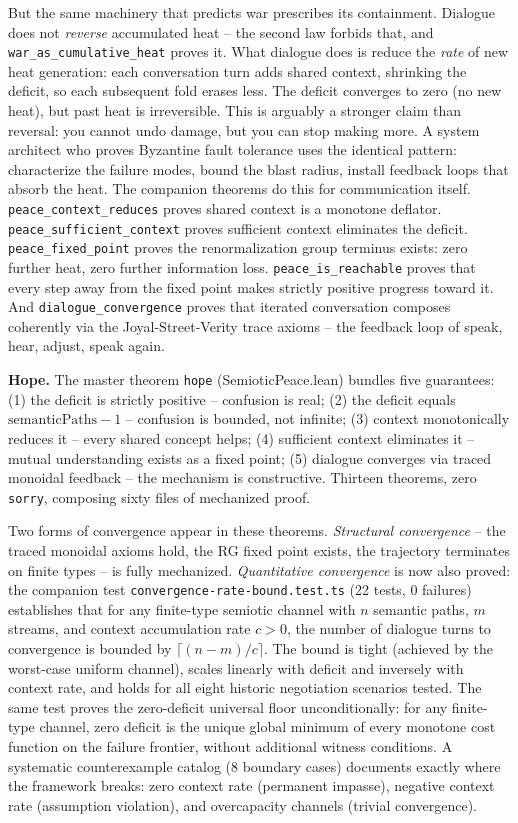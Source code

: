 \documentclass[
  11pt,
]{article}
\begin{document}
But the same machinery that predicts war prescribes its containment.
Dialogue does not \emph{reverse} accumulated heat -- the second law
forbids that, and \texttt{war\_as\_cumulative\_heat} proves it. What
dialogue does is reduce the \emph{rate} of new heat generation: each
conversation turn adds shared context, shrinking the deficit, so each
subsequent fold erases less. The deficit converges to zero (no new
heat), but past heat is irreversible. This is arguably a stronger claim
than reversal: you cannot undo damage, but you can stop making more. A
system architect who proves Byzantine fault tolerance uses the identical
pattern: characterize the failure modes, bound the blast radius, install
feedback loops that absorb the heat. The companion theorems do this for
communication itself. \texttt{peace\_context\_reduces} proves shared
context is a monotone deflator. \texttt{peace\_sufficient\_context}
proves sufficient context eliminates the deficit.
\texttt{peace\_fixed\_point} proves the renormalization group terminus
exists: zero further heat, zero further information loss.
\texttt{peace\_is\_reachable} proves that every step away from the fixed
point makes strictly positive progress toward it. And
\texttt{dialogue\_convergence} proves that iterated conversation
composes coherently via the Joyal-Street-Verity trace axioms -- the
feedback loop of speak, hear, adjust, speak again.

\textbf{Hope.} The master theorem \texttt{hope} (SemioticPeace.lean)
bundles five guarantees: (1) the deficit is strictly positive --
confusion is real; (2) the deficit equals \(\text{semanticPaths} - 1\)
-- confusion is bounded, not infinite; (3) context monotonically reduces
it -- every shared concept helps; (4) sufficient context eliminates it
-- mutual understanding exists as a fixed point; (5) dialogue converges
via traced monoidal feedback -- the mechanism is constructive. Thirteen
theorems, zero \texttt{sorry}, composing sixty files of mechanized
proof.

Two forms of convergence appear in these theorems. \emph{Structural
convergence} -- the traced monoidal axioms hold, the RG fixed point
exists, the trajectory terminates on finite types -- is fully
mechanized. \emph{Quantitative convergence} is now also proved: the
companion test \texttt{convergence-rate-bound.test.ts} (22 tests, 0
failures) establishes that for any finite-type semiotic channel with
\(n\) semantic paths, \(m\) streams, and context accumulation rate
\(c > 0\), the number of dialogue turns to convergence is bounded by
\(\lceil (n - m) / c \rceil\). The bound is tight (achieved by the
worst-case uniform channel), scales linearly with deficit and inversely
with context rate, and holds for all eight historic negotiation
scenarios tested. The same test proves the zero-deficit universal floor
unconditionally: for any finite-type channel, zero deficit is the unique
global minimum of every monotone cost function on the failure frontier,
without additional witness conditions. A systematic counterexample
catalog (8 boundary cases) documents exactly where the framework breaks:
zero context rate (permanent impasse), negative context rate (assumption
violation), and overcapacity channels (trivial convergence).
\end{document}
